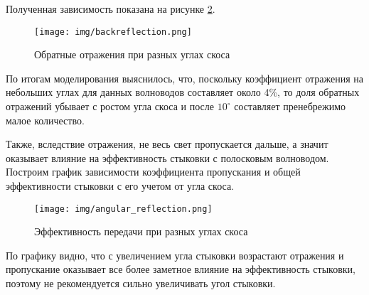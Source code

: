 Полученная зависимость показана на рисунке \ref{backreflection}.

\begin{figure}[h!]
	\texttt{[image: img/backreflection.png]}
	\caption{Обратные отражения при разных углах скоса}
	\label{backreflection}
\end{figure}

По итогам моделирования выяснилось, что, поскольку коэффициент отражения на небольших углах для данных волноводов составляет около 4\%, то доля обратных отражений убывает с ростом угла скоса и после $10^{\circ}$ составляет пренебрежимо малое количество. 

Также, вследствие отражения, не весь свет пропускается дальше, а значит оказывает влияние на эффективность стыковки с полосковым волноводом. Построим график зависимости коэффициента пропускания и общей эффективности стыковки с его учетом от угла скоса.

\begin{figure}[h!]
	\texttt{[image: img/angular\_reflection.png]}
	\caption{Эффективность передачи при разных углах скоса}
	\label{backreflection}
\end{figure}

По графику видно, что с увеличением угла стыковки возрастают отражения и пропускание оказывает все более заметное влияние на эффективность стыковки, поэтому не рекомендуется сильно увеличивать угол стыковки.